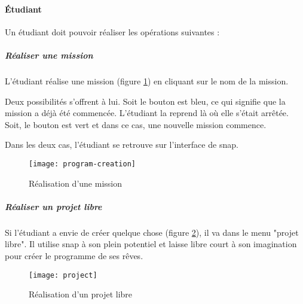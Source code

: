 \paragraph{Étudiant}
Un étudiant doit pouvoir réaliser les opérations suivantes :
\subparagraph{Réaliser une mission} L'étudiant réalise une \gls{mission} (figure \ref{fig:program-creation}) en cliquant sur le nom de la \gls{mission}.

Deux possibilités s'offrent à lui. Soit le bouton est bleu, ce qui signifie que la \gls{mission} a déjà été commencée. L'étudiant la reprend là où elle s'était arrêtée. Soit, le bouton est vert et dans ce cas, une nouvelle \gls{mission} commence.

Dans les deux cas, l'étudiant se retrouve sur l'interface de \gls{snap}.
\begin{figure}
  \begin{center}
    \texttt{[image: program-creation]}
    \caption{Réalisation d'une mission}
    \label{fig:program-creation}
  \end{center}
\end{figure}

\subparagraph{Réaliser un projet libre} Si l'étudiant a envie de créer quelque chose (figure \ref{fig:project}), il va dans le menu "projet libre". Il utilise \gls{snap} à son plein potentiel et laisse libre court à son imagination pour créer le programme de ses rêves.
\begin{figure}
  \begin{center}
    \texttt{[image: project]}
    \caption{Réalisation d'un projet libre}
    \label{fig:project}
  \end{center}
\end{figure}
